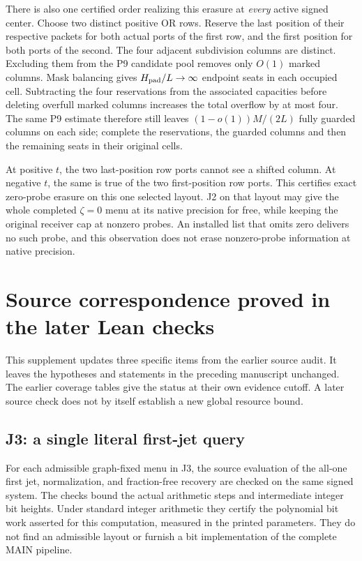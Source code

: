 \documentclass[11pt,a4paper]{article}
\begin{document}
There is also one certified order realizing this erasure at
\emph{every} active signed center. Choose two distinct positive OR
rows. Reserve the last position of their respective packets for
both actual ports of the first row, and the first position for both
ports of the second. The four adjacent subdivision columns are
distinct. Excluding them from the P9 candidate pool removes only
\(O(1)\) marked columns. Mask balancing gives \(H_{\rm pad}/L\to\infty\)
endpoint seats in each occupied cell. Subtracting the four reservations
from the associated capacities before deleting overfull marked
columns increases the total overflow by at most four. The same P9
estimate therefore still leaves \((1-o(1))M/(2L)\) fully guarded
columns on each side; complete the reservations, the guarded columns
and then the remaining seats in their original cells.

At positive \(t\), the two last-position row ports cannot see a
shifted column. At negative \(t\), the same is true of the two
first-position row ports. This certifies exact zero-probe erasure
on this one selected layout. J2 on that layout may give the whole
completed \(\zeta=0\) menu at its native precision for free, while
keeping the original receiver cap at nonzero probes. An installed
list that omits zero delivers no such probe, and this observation
does not erase nonzero-probe information at native precision.


\clearpage
\section{Source correspondence proved in the later Lean checks}\label{r64-source-correspondence}
This supplement updates three specific items from the earlier source audit.
It leaves the hypotheses and statements in the preceding manuscript unchanged.
The earlier coverage tables give the status at their own evidence cutoff.
A later source check does not by itself establish a new global resource bound.

\subsection{J3: a single literal first-jet query}
For each admissible graph-fixed menu in J3, the source evaluation of the
all-one first jet, normalization, and fraction-free recovery are checked
on the same signed system. The checks bound the actual arithmetic steps
and intermediate integer bit heights. Under standard integer arithmetic
they certify the polynomial bit work asserted for this computation,
measured in the printed parameters. They do not find an admissible
layout or furnish a bit implementation of the complete MAIN pipeline.
\end{document}
